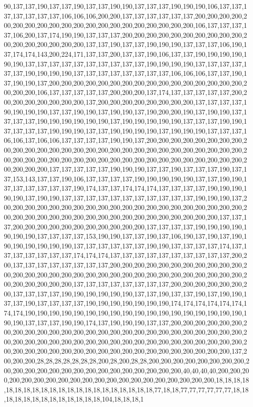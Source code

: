 90,137,137,190,137,137,190,137,137,190,190,137,137,137,190,190,190,106,137,137,137,137,137,137,137,106,106,106,200,200,137,137,137,137,137,137,200,200,200,200,200,200,200,200,200,200,200,200,200,200,200,200,200,200,200,200,106,137,137,137,137,106,200,137,174,190,190,137,137,137,200,200,200,200,200,200,200,200,200,200,200,200,200,200,200,200,200,137,137,190,137,137,190,190,190,137,137,137,106,190,137,174,174,143,200,224,171,137,137,200,137,137,190,106,137,137,190,190,190,190,190,190,137,137,137,137,137,137,137,137,137,137,190,190,190,190,137,137,137,137,137,137,190,190,190,190,137,137,137,137,137,137,137,137,106,106,106,137,137,190,137,190,190,137,200,200,200,200,200,200,200,200,200,200,200,200,200,200,200,200,200,200,200,106,137,137,137,137,137,200,200,200,137,174,137,137,137,137,137,200,200,200,200,200,200,200,200,137,200,200,200,200,200,200,200,200,137,137,137,137,190,190,190,190,137,137,190,190,137,190,190,137,190,200,200,190,137,190,190,137,137,137,137,190,190,190,190,190,190,137,190,190,190,190,190,137,137,137,190,190,137,137,137,137,190,190,190,137,137,190,190,190,190,137,190,190,190,137,137,137,106,106,137,106,106,137,137,137,137,190,190,137,200,200,200,200,200,200,200,200,200,200,200,200,200,200,200,200,200,200,200,200,200,200,200,200,200,200,200,200,200,200,200,200,200,200,200,200,200,200,200,200,200,200,200,200,200,200,200,200,200,200,200,200,137,137,137,137,137,190,190,190,137,137,190,137,137,137,190,137,137,153,143,137,137,190,106,137,137,137,137,190,190,190,190,190,137,137,190,190,137,137,137,137,137,137,190,174,137,137,174,174,174,137,137,137,137,190,190,190,190,190,137,190,190,137,137,137,137,137,137,137,137,137,137,137,190,190,190,137,200,200,200,200,200,200,200,200,200,200,200,200,200,200,200,200,200,200,200,200,200,200,200,200,200,200,200,200,200,200,200,200,200,200,200,200,200,200,137,137,137,200,200,200,200,200,200,200,200,200,200,200,137,137,137,137,190,190,190,190,190,190,190,137,137,137,137,153,190,190,137,137,190,137,106,190,137,190,137,190,190,190,190,190,190,190,137,137,137,137,137,137,190,190,137,137,137,137,174,137,137,137,137,137,137,137,174,174,174,137,137,137,137,137,137,137,137,137,137,200,200,137,137,137,137,137,137,137,137,200,200,200,200,200,200,200,200,200,200,200,200,200,200,200,200,200,200,200,200,200,200,200,200,200,200,200,200,200,200,200,200,200,200,200,200,200,137,137,137,137,137,137,137,137,200,200,200,200,200,200,200,137,137,137,137,190,190,190,190,190,190,137,137,190,137,137,190,137,190,190,137,137,190,137,137,137,137,190,190,190,190,190,190,190,174,174,174,174,174,174,174,174,190,190,190,190,190,190,190,190,190,190,190,190,190,190,190,190,190,190,190,190,137,137,137,190,190,174,137,190,190,190,137,137,200,200,200,200,200,200,200,200,200,200,200,200,200,200,200,200,200,200,200,200,200,200,200,200,200,200,200,200,200,200,200,200,200,200,200,200,200,200,200,200,200,200,200,200,200,200,200,200,200,200,200,200,200,200,200,200,200,200,200,200,200,200,200,200,200,137,200,200,200,28,28,28,28,28,28,28,200,28,200,28,28,200,200,200,200,200,200,200,200,200,200,200,200,200,200,200,200,200,200,200,200,200,200,200,40,40,40,40,200,200,200,200,200,200,200,200,200,200,200,200,200,200,200,200,200,200,200,200,18,18,18,18,18,18,18,18,18,18,18,18,18,18,18,18,18,18,18,18,18,77,18,18,77,77,77,77,77,77,18,18,18,18,18,18,18,18,18,18,18,18,18,104,18,18,18,1